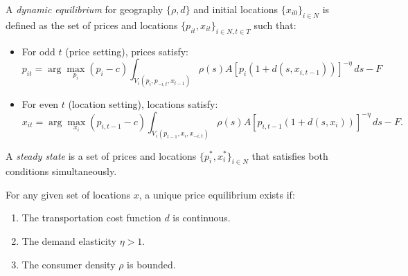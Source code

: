 A \textit{dynamic equilibrium} for geography \( \{\rho,d\} \) and initial locations \( \{x_{i0}\}_{i \in N} \) is defined as the set of prices and locations \( \{p_{it}, x_{it}\}_{i \in N, t \in T} \) such that:

\begin{itemize}
    \item For odd \( t \) (price setting), prices satisfy:
    \[
        p_{it} = \arg\max_{p_i} (p_i - c) \int_{V_i(p_i, p_{-i,t}, x_{t-1})} \rho(s) A [p_i(1 + d(s, x_{i,t-1}))]^{-\eta} \, ds - F
    \]
    \item For even \( t \) (location setting), locations satisfy:
    \[
        x_{it} = \arg\max_{x_i} (p_{i,t-1} - c) \int_{V_i(p_{t-1}, x_i, x_{-i,t})} \rho(s) A [p_{i,t-1}(1 + d(s, x_i))]^{-\eta} \, ds - F.
    \]
\end{itemize}

A \textit{steady state} is a set of prices and locations \( \{p^*_i, x^*_i\}_{i \in N} \) that satisfies both conditions simultaneously.

\begin{proposition}  
For any given set of locations \( x \), a unique price equilibrium exists if:
\begin{enumerate}
    \item The transportation cost function \( d \) is continuous.
    \item The demand elasticity \( \eta > 1 \).
    \item The consumer density \( \rho \) is bounded.
\end{enumerate}
\end{proposition}

